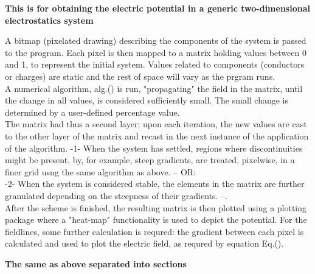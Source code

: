 \documentclass{article}
\begin{document}
  \noindent\textbf{This is for obtaining the electric potential in a generic two-dimensional electrostatics system}

  \vspace{5mm}

	A bitmap (pixelated drawing) describing the components of the system is passed to the program. Each pixel is then 
	 mapped to a matrix holding values between 0 and 1, to represent the initial system. Values related to components
	 (conductors or charges) are static and the rest of space will vary as the prgram runs.\\
	A numerical algorithm, alg.() is run, "propagating" the field in the matrix, until the change in all values, is 
	 considered sufficiently small. The small change is determined by a user-defined percentage value. \\
	The matrix had thus a second layer; upon each iteration, the new values are cast to the other layer of the 
	 matrix and recast in the next instance of the application of the algorithm. 
	-1- When the system has settled, regions where discontinuities might be present, by, for example,
	 steep gradients, are treated, pixelwise, in a finer grid usng the same algorithm as above. -- OR: \\
	-2- When the system is considered stable, the elements in the matrix are further granulated depending on the 
	 steepness of their gradients. --. \\
	After the scheme is finished, the resulting matrix is then plotted using a plotting package where  a "heat-map" 
	 functionality is used to depict the potential. For the fieldlines, some further calculation is requred: the 
	 gradient between each pixel is calculated and used to plot the electric field, as requred by equation Eq.().

\vspace{7.5mm}

\noindent\textbf{The same as above separated into sections}

\vspace{5mm}
\end{document}
